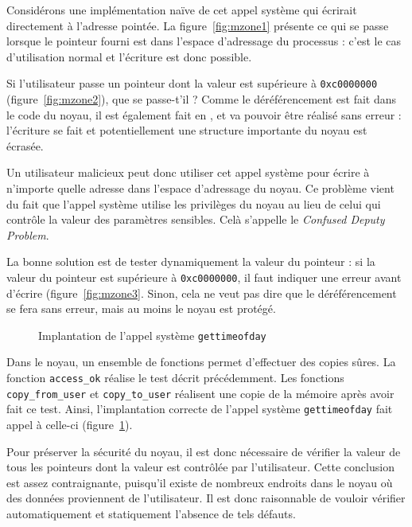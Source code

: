 Considérons une implémentation naïve de cet appel système qui écrirait
directement à l'adresse pointée. La figure~\ref{fig:mzone1} présente ce qui se
passe lorsque le pointeur fourni est dans l'espace d'adressage du processus :
c'est le cas d'utilisation normal et l'écriture est donc possible.

Si l'utilisateur passe un pointeur dont la valeur est supérieure à
\texttt{0xc0000000} (figure~\ref{fig:mzone2}), que se passe-t'il ? Comme le
déréférencement est fait dans le code du noyau, il est également fait en
, et va pouvoir être réalisé sans erreur : l'écriture se fait et
potentiellement une structure importante du noyau est écrasée.

Un utilisateur malicieux peut donc utiliser cet appel système pour écrire à
n'importe quelle adresse dans l'espace d'adressage du noyau. Ce problème vient
du fait que l'appel système utilise les privilèges du noyau au lieu de celui qui
contrôle la valeur des paramètres sensibles. Celà s'appelle le \emph{Confused
Deputy Problem}\cite{hardy88confused}.

La bonne solution est de tester dynamiquement la valeur du pointeur : si la
valeur du pointeur est supérieure à \texttt{0xc0000000}, il faut indiquer une
erreur avant d'écrire (figure~\ref{fig:mzone3}. Sinon, cela ne veut pas dire
que le déréférencement se fera sans erreur, mais au moins le noyau est protégé.

\begin{figure}
  \caption{Implantation de l'appel système \texttt{gettimeofday}}
  \label{fig:implem-gettime}
\end{figure}

Dans le noyau, un ensemble de fonctions permet d'effectuer des copies sûres. La
fonction \texttt{access\_ok} réalise le test décrit précédemment. Les fonctions
\texttt{copy\_from\_user} et \texttt{copy\_to\_user} réalisent une copie de la
mémoire après avoir fait ce test. Ainsi, l'implantation correcte de l'appel
système \texttt{gettimeofday} fait appel à celle-ci
(figure~\ref{fig:implem-gettime}).

Pour préserver la sécurité du noyau, il est donc nécessaire de vérifier la
valeur de tous les pointeurs dont la valeur est contrôlée par l'utilisateur.
Cette conclusion est assez contraignante, puisqu'il existe de nombreux endroits
dans le noyau où des données proviennent de l'utilisateur. Il est donc
raisonnable de vouloir vérifier automatiquement et statiquement l'absence de
tels défauts.

